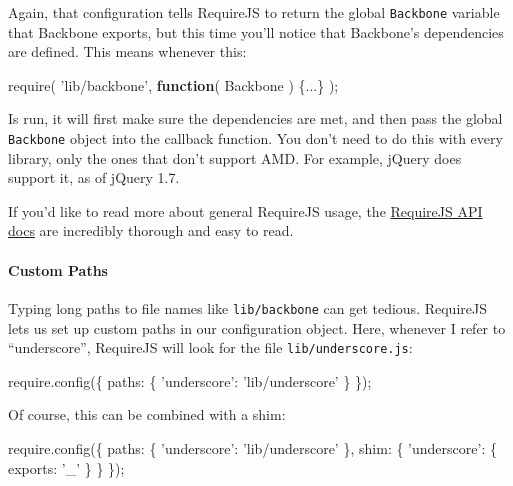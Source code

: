 \documentclass[9pt]{book}
\newenvironment{Shaded}{}{}
\newcommand{\KeywordTok}[1]{\textcolor[rgb]{0.00,0.44,0.13}{\textbf{{#1}}}}
\newcommand{\DataTypeTok}[1]{\textcolor[rgb]{0.56,0.13,0.00}{{#1}}}
\newcommand{\StringTok}[1]{\textcolor[rgb]{0.25,0.44,0.63}{{#1}}}
\newcommand{\OtherTok}[1]{\textcolor[rgb]{0.00,0.44,0.13}{{#1}}}
\newcommand{\FunctionTok}[1]{\textcolor[rgb]{0.02,0.16,0.49}{{#1}}}
\newcommand{\NormalTok}[1]{{#1}}
\begin{document}
Again, that configuration tells RequireJS to return the global
\texttt{Backbone} variable that Backbone exports, but this time you'll
notice that Backbone's dependencies are defined. This means whenever
this:

\begin{Shaded}
\begin{Highlighting}[]
\FunctionTok{require}\NormalTok{( }\StringTok{'lib/backbone'}\NormalTok{, }\KeywordTok{function}\NormalTok{( Backbone ) \{...\} );}
\end{Highlighting}
\end{Shaded}

Is run, it will first make sure the dependencies are met, and then pass
the global \texttt{Backbone} object into the callback function. You
don't need to do this with every library, only the ones that don't
support AMD. For example, jQuery does support it, as of jQuery 1.7.

If you'd like to read more about general RequireJS usage, the
\href{http://requirejs.org/docs/api.html}{RequireJS API docs} are
incredibly thorough and easy to read.

\paragraph{Custom Paths}\label{custom-paths}

Typing long paths to file names like \texttt{lib/backbone} can get
tedious. RequireJS lets us set up custom paths in our configuration
object. Here, whenever I refer to ``underscore'', RequireJS will look
for the file \texttt{lib/underscore.js}:

\begin{Shaded}
\begin{Highlighting}[]
\OtherTok{require}\NormalTok{.}\FunctionTok{config}\NormalTok{(\{}
    \DataTypeTok{paths}\NormalTok{: \{}
        \StringTok{'underscore'}\NormalTok{: }\StringTok{'lib/underscore'}
    \NormalTok{\}}
\NormalTok{\});}
\end{Highlighting}
\end{Shaded}

Of course, this can be combined with a shim:

\begin{Shaded}
\begin{Highlighting}[]
\OtherTok{require}\NormalTok{.}\FunctionTok{config}\NormalTok{(\{}
    \DataTypeTok{paths}\NormalTok{: \{}
        \StringTok{'underscore'}\NormalTok{: }\StringTok{'lib/underscore'}
    \NormalTok{\},}
    \DataTypeTok{shim}\NormalTok{: \{}
        \StringTok{'underscore'}\NormalTok{: \{}
          \DataTypeTok{exports}\NormalTok{: }\StringTok{'_'}
        \NormalTok{\}}
    \NormalTok{\}}
\NormalTok{\});}
\end{Highlighting}
\end{Shaded}
\end{document}
